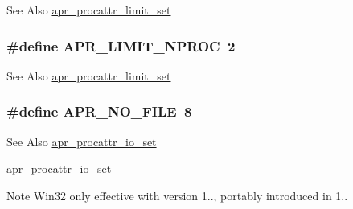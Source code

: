 \begin{DoxySeeAlso}{See Also}
\hyperlink{group__apr__thread__proc_ga4de85cfd54d27476dbb943955c1b0a2a}{apr\-\_\-procattr\-\_\-limit\-\_\-set} 
\end{DoxySeeAlso}
\hypertarget{group__apr__thread__proc_ga72e9be453a20f4e78bc6d7bd95d7c333}{
\subsubsection[{A\-P\-R\-\_\-\-L\-I\-M\-I\-T\-\_\-\-N\-P\-R\-O\-C}]{\setlength{\rightskip}{0pt plus 5cm}\#define A\-P\-R\-\_\-\-L\-I\-M\-I\-T\-\_\-\-N\-P\-R\-O\-C~2}}\label{group__apr__thread__proc_ga72e9be453a20f4e78bc6d7bd95d7c333}
\begin{DoxySeeAlso}{See Also}
\hyperlink{group__apr__thread__proc_ga4de85cfd54d27476dbb943955c1b0a2a}{apr\-\_\-procattr\-\_\-limit\-\_\-set} 
\end{DoxySeeAlso}
\hypertarget{group__apr__thread__proc_ga597fb6a501c20cc3a597fe6c613f4310}{
\subsubsection[{A\-P\-R\-\_\-\-N\-O\-\_\-\-F\-I\-L\-E}]{\setlength{\rightskip}{0pt plus 5cm}\#define A\-P\-R\-\_\-\-N\-O\-\_\-\-F\-I\-L\-E~8}}\label{group__apr__thread__proc_ga597fb6a501c20cc3a597fe6c613f4310}
\begin{DoxySeeAlso}{See Also}
\hyperlink{group__apr__thread__proc_ga2b1598bc6f5ab0bfcf2e55096d563c98}{apr\-\_\-procattr\-\_\-io\-\_\-set}

\hyperlink{group__apr__thread__proc_ga2b1598bc6f5ab0bfcf2e55096d563c98}{apr\-\_\-procattr\-\_\-io\-\_\-set} 
\end{DoxySeeAlso}
\begin{DoxyNote}{Note}
Win32 only effective with version 1.., portably introduced in 1.. 
\end{DoxyNote}
